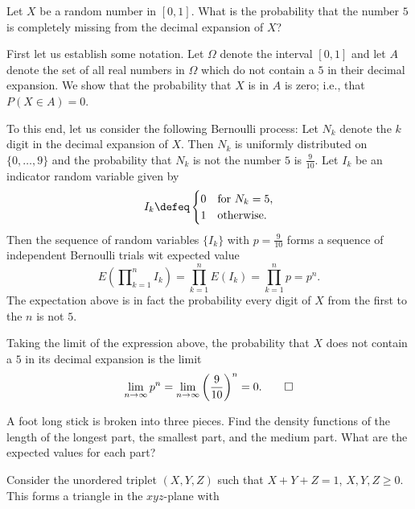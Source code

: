 \begin{problem}[Handout 18, \# 16]
  Let \(X\) be a random number in \([0,1]\). What is the probability that
  the number \(5\) is completely missing from the decimal expansion of
  \(X\)?
\end{problem}
\begin{solution}
  First let us establish some notation. Let \(\Omega\) denote the interval
  \([0,1]\) and let \(A\) denote the set of all real numbers in \(\Omega\)
  which do not contain a \(5\) in their decimal expansion. We show that the
  probability that \(X\) is in \(A\) is zero; i.e., that \(P(X\in A)=0\).

  To this end, let us consider the following Bernoulli process: Let \(N_k\)
  denote the \(k\) digit in the decimal expansion of
  \(X\). Then \(N_k\) is uniformly distributed on \(\{0,\dotsc,9\}\) and
  the probability that \(N_k\) is not the number \(5\) is
  \(\frac{9}{10}\). Let \(I_k\) be an indicator random variable given by
  \[
    I_k\defeq%
    \begin{cases}%
      0&\text{for \(N_k=5\),}\\
      1&\text{otherwise.}
    \end{cases}
  \]
  Then the sequence of random variables \(\{I_k\}\) with \(p=\frac{9}{10}\)
  forms a sequence of independent Bernoulli trials wit expected value
  \[
    E\left(\prod\nolimits_{k=1}^n I_k\right)=%
    \prod_{k=1}^n E(I_k)=%
    \prod_{k=1}^n p=p^n.
  \]
  The expectation above is in fact the probability every digit of \(X\)
  from the first to the \(n\) is not \(5\).

  Taking the limit of the expression above, the probability that \(X\) does
  not contain a \(5\) in its decimal expansion is the limit
  \[
    \lim_{n\to\infty}
    p^n=\lim_{n\to\infty}\left(\frac{9}{10}\right)^n=0.\qedhere
  \]
\end{solution}
\newpage

\begin{problem}[Handout 18, \# 17]
  A foot long stick is broken into three pieces. Find the density functions
  of the length of the longest part, the smallest part, and the medium
  part. What are the expected values for each part?
\end{problem}
\begin{solution}
  Consider the unordered triplet \((X,Y,Z)\) such that \(X+Y+Z=1\),
  \(X,Y,Z\geq 0\). This forms a triangle in the \(xyz\)-plane with
\end{solution}

